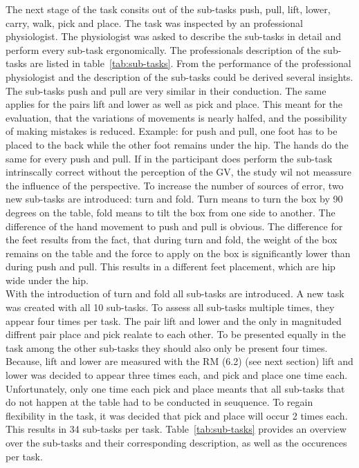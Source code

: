 The next stage of the task consits out of the sub-tasks push, pull, lift, lower, carry, walk, pick and place. The task was inspected by an professional physiologist. The physiologist was asked to describe the sub-tasks in detail and perform every sub-task ergonomically. The professionals description of the sub-tasks are listed in table~\ref{tab:sub-tasks}. From the performance of the professional physiologist and the description of the sub-tasks could be derived several insights. The sub-tasks push and pull are very similar in their conduction. The same applies for the pairs lift and lower as well as pick and place. This meant for the evaluation, that the variations of movements is nearly halfed, and the possibility of making mistakes is reduced. Example: for push and pull, one foot has to be placed to the back while the other foot remains under the hip. The hands do the same for every push and pull. If in the participant does perform the sub-task intrinscally correct without the perception of the GV, the study wil not meassure the influence of the perspective. To increase the number of sources of error, two new sub-tasks are introduced: turn and fold. Turn means to turn the box by 90 degrees on the table, fold means to tilt the box from one side to another. The difference of the hand movement to push and pull is obvious. The difference for the feet results from the fact, that during turn and fold, the weight of the box remains on the table and the force to apply on the box is significantly lower than during push and pull. This results in a different feet placement, which are hip wide under the hip.\\
With the introduction of turn and fold all sub-tasks are introduced. A new task was created with all 10 sub-tasks. To assess all sub-tasks multiple times, they appear four times per task. The pair lift and lower and the only in magnituded diffrent pair place and pick realate to each other. To be presented equally in the task among the other sub-tasks they should also only be present four times. Because, lift and lower are measured with the RM (6.2) (see next section) lift and lower was decided to appear three times each, and pick and place one time each. Unfortunately, only one time each pick and place meants that all sub-tasks that do not happen at the table had to be conducted in seuquence. To regain flexibility in the task, it was decided that pick and place will occur 2 times each. This results in 34 sub-tasks per task. Table~\ref{tab:sub-tasks} provides an overview over the sub-tasks and their corresponding description, as well as the occurences per task.

